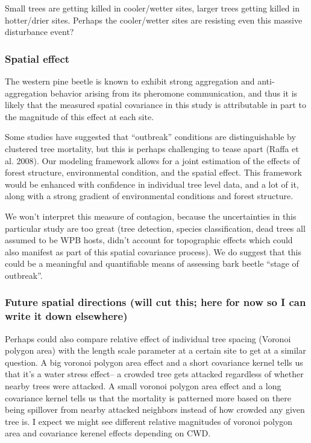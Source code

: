 \documentclass[]{article}
\begin{document}
Small trees are getting killed in cooler/wetter sites, larger trees
getting killed in hotter/drier sites. Perhaps the cooler/wetter sites
are resisting even this massive disturbance event?

\subsubsection{Spatial effect}\label{spatial-effect}

The western pine beetle is known to exhibit strong aggregation and
anti-aggregation behavior arising from its pheromone communication, and
thus it is likely that the measured spatial covariance in this study is
attributable in part to the magnitude of this effect at each site.

Some studies have suggested that ``outbreak'' conditions are
distinguishable by clustered tree mortality, but this is perhaps
challenging to tease apart (Raffa et al. 2008). Our modeling framework
allows for a joint estimation of the effects of forest structure,
environmental condition, and the spatial effect. This framework would be
enhanced with confidence in individual tree level data, and a lot of it,
along with a strong gradient of environmental conditions and forest
structure.

We won't interpret this measure of contagion, because the uncertainties
in this particular study are too great (tree detection, species
classification, dead trees all assumed to be WPB hosts, didn't account
for topographic effects which could also manifest as part of this
spatial covariance process). We do suggest that this could be a
meaningful and quantifiable means of assessing bark beetle ``stage of
outbreak''.

\subsubsection{Future spatial directions (will cut this; here for now so
I can write it down
elsewhere)}\label{future-spatial-directions-will-cut-this-here-for-now-so-i-can-write-it-down-elsewhere}

Perhaps could also compare relative effect of individual tree spacing
(Voronoi polygon area) with the length scale parameter at a certain site
to get at a similar question. A big voronoi polygon area effect and a
short covariance kernel tells us that it's a water stress effect-- a
crowded tree gets attacked regardless of whether nearby trees were
attacked. A small voronoi polygon area effect and a long covariance
kernel tells us that the mortality is patterned more based on there
being spillover from nearby attacked neighbors instead of how crowded
any given tree is. I expect we might see different relative magnitudes
of voronoi polygon area and covariance kerenel effects depending on CWD.
\end{document}
